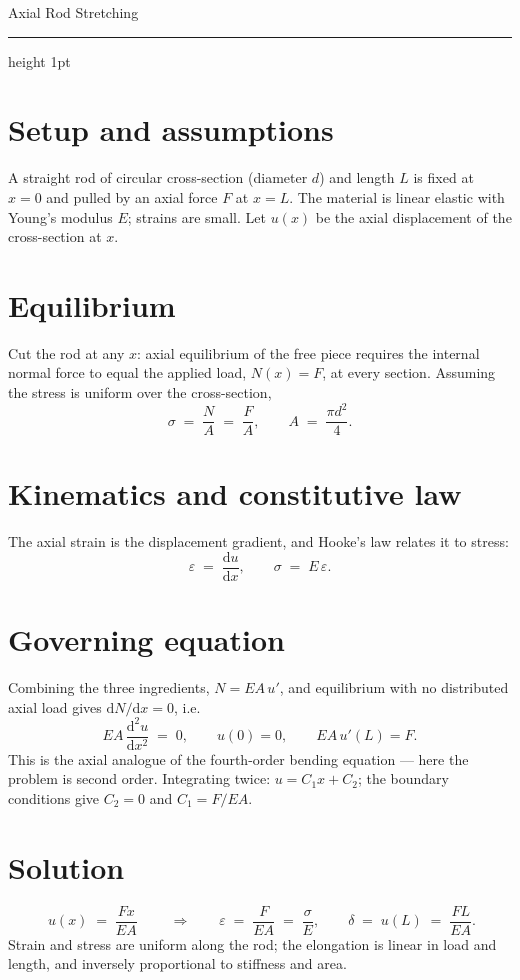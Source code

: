 \documentclass[10pt,a4paper]{article}
\begin{document}
{\LARGE Axial Rod Stretching}
\medskip
{\color{celline}\hrule height 1pt}

\section*{Setup and assumptions}
A straight rod of circular cross-section (diameter $d$) and length $L$ is fixed at
$x = 0$ and pulled by an axial force $F$ at $x = L$. The material is linear
elastic with Young's modulus $E$; strains are small. Let $u(x)$ be the axial
displacement of the cross-section at $x$.

\section*{Equilibrium}
Cut the rod at any $x$: axial equilibrium of the free piece requires the internal
normal force to equal the applied load, $N(x) = F$, at every section. Assuming the
stress is uniform over the cross-section,
\begin{equation}
\sigma \;=\; \frac{N}{A} \;=\; \frac{F}{A},
\qquad
A \;=\; \frac{\pi d^2}{4}.
\end{equation}

\section*{Kinematics and constitutive law}
The axial strain is the displacement gradient, and Hooke's law relates it to
stress:
\begin{equation}
\varepsilon \;=\; \frac{\mathrm{d}u}{\mathrm{d}x},
\qquad
\sigma \;=\; E\,\varepsilon .
\end{equation}

\section*{Governing equation}
Combining the three ingredients, $N = EA\,u'$, and equilibrium with no distributed
axial load gives $\mathrm{d}N/\mathrm{d}x = 0$, i.e.
\begin{equation}
EA \,\frac{\mathrm{d}^2 u}{\mathrm{d}x^2} \;=\; 0,
\qquad
u(0) = 0, \qquad EA\,u'(L) = F .
\end{equation}
This is the axial analogue of the fourth-order bending equation --- here the
problem is second order. Integrating twice: $u = C_1 x + C_2$; the boundary
conditions give $C_2 = 0$ and $C_1 = F/EA$.

\section*{Solution}
\begin{equation}
\boxed{\; u(x) \;=\; \frac{F x}{E A} \;}
\qquad\Rightarrow\qquad
\varepsilon \;=\; \frac{F}{EA} \;=\; \frac{\sigma}{E},
\qquad
\delta \;=\; u(L) \;=\; \frac{F L}{E A}.
\end{equation}
Strain and stress are uniform along the rod; the elongation is linear in load and
length, and inversely proportional to stiffness and area.
\end{document}
